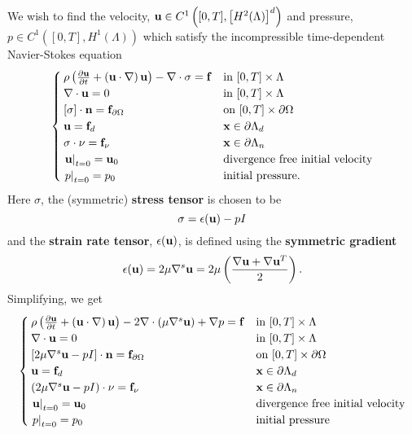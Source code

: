 \documentclass[letterpaper]{erdc}
\begin{document}
We wish to find the velocity, $\textbf{u}\in C^{1}\left([0,T], \left[H^{2}(\Lambda)\right]^d\right)$ and pressure, $p\in C^{1}\left([0,T],H^{1}(\Lambda)\right)$ which satisfy the incompressible time-dependent Navier-Stokes equation
\begin{equation}\label{eq:nspde01}
  \begin{cases}
		\rho\left(\frac{\partial \textbf{u}}{\partial t} + \left(\textbf{u}\cdot\nabla\right)\textbf{u}  \right) - \nabla\cdot \sigma = \mathbf{f} & \mbox{in }[0,T]\times\Lambda\\
		\nabla\cdot \textbf{u} = 0 & \mbox{in }[0,T]\times\Lambda\\
		\left[\sigma \right]\cdot\textbf{n} = \mathbf{f}_{\partial\Omega}  & \mbox{on }[0,T]\times\partial\Omega \\
		\textbf{u} = \mathbf{f}_d  & \textbf{x} \in\partial\Lambda_{d}\\
		\sigma\cdot\nu = \mathbf{f}_{\nu} & \textbf{x}\in \partial\Lambda_{n}\\
		\left.\textbf{u}\right|_{t=0} = \textbf{u}_{0} & \mbox{divergence free initial velocity}\\
		\left.p\right|_{t=0} = p_0 & \mbox{initial pressure.}
	\end{cases}
\end{equation}
Here $\sigma$, the (symmetric) \textbf{stress tensor} is chosen to be
\begin{equation}
	 \sigma = \epsilon(\textbf{u}) - pI
\end{equation}
and the \textbf{strain rate tensor}, $\epsilon(\textbf{u})$, is defined using the \textbf{symmetric gradient}
\begin{equation}
	\epsilon(\textbf{u}) = 2\mu \nabla^{s} \textbf{u} = 2\mu\left(\frac{\nabla\textbf{u} + \nabla\textbf{u}^{T}}{2}\right).
\end{equation}
 Simplifying, we get
\begin{equation}\label{eq:nspde02}
  \begin{cases}
		\rho\left(\frac{\partial \textbf{u}}{\partial t} + \left(\textbf{u}\cdot\nabla\right)\textbf{u}  \right) - 2\nabla\cdot\left(\mu \nabla^{s}\textbf{u} \right) + \nabla p = \mathbf{f} & \mbox{in }[0,T]\times\Lambda\\
		\nabla\cdot \textbf{u} = 0 & \mbox{in }[0,T]\times\Lambda\\
		\left[ 2\mu\nabla^{s}\textbf{u} - p I \right]\cdot\textbf{n} = \mathbf{f}_{\partial\Omega}  & \mbox{on }[0,T]\times\partial\Omega \\
		\textbf{u} = \mathbf{f}_d  & \textbf{x} \in\partial\Lambda_{d}\\
		\left(2\mu\nabla^{s}\textbf{u}-p I\right)\cdot\nu = \mathbf{f}_{\nu} & \textbf{x}\in \partial\Lambda_{n}\\
		\left.\textbf{u}\right|_{t=0} = \textbf{u}_{0} & \mbox{divergence free initial velocity} \\
		\left.p\right|_{t=0} = p_0 & \mbox{initial pressure}
	\end{cases}
\end{equation}
\end{document}
